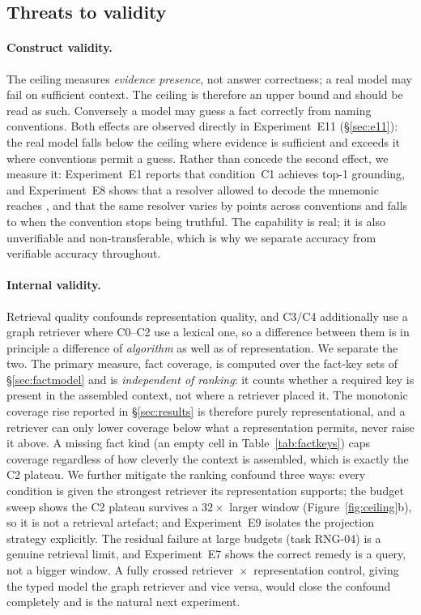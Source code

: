 \subsection{Threats to validity}
\label{sec:threats}

\paragraph{Construct validity.} The ceiling measures \emph{evidence presence},
not answer correctness; a real model may fail on sufficient context. The ceiling
is therefore an upper bound and should be read as such. Conversely a model may
guess a fact correctly from naming conventions. Both effects are observed directly
in Experiment~E11 (\S\ref{sec:e11}): the real model falls below the ceiling where
evidence is sufficient and exceeds it where conventions permit a guess. Rather
than concede the second effect, we measure it: Experiment~E1 reports that
condition~C1 achieves \GrndTopOneCOne{}
top-1 grounding, and Experiment~E8 shows that a resolver allowed to decode the
mnemonic reaches \ConvMnemonicDecoded{}, and that the same resolver varies by
\ConvSpreadCOnePlusconv{} points across conventions and falls to
\ConvLyingDecoded{} when the convention stops being truthful. The capability is
real; it is also unverifiable and non-transferable, which is why we separate
accuracy from verifiable accuracy throughout.

\paragraph{Internal validity.} Retrieval quality confounds representation
quality, and C3/C4 additionally use a graph retriever where C0--C2 use a lexical
one, so a difference between them is in principle a difference of \emph{algorithm}
as well as of representation. We separate the two. The primary measure, fact
coverage, is computed over the fact-key sets of \S\ref{sec:factmodel} and is
\emph{independent of ranking}: it counts whether a required key is present in the
assembled context, not where a retriever placed it. The monotonic coverage rise
reported in \S\ref{sec:results} is therefore purely representational, and a
retriever can only lower coverage below what a representation permits, never
raise it above. A missing fact kind (an empty cell in Table~\ref{tab:factkeys})
caps coverage regardless of how cleverly the context is assembled, which is
exactly the C2 plateau. We further mitigate the ranking confound three ways:
every condition is given the strongest retriever its representation supports; the
budget sweep shows the C2 plateau survives a $32\times$ larger window
(Figure~\ref{fig:ceiling}b), so it is not a retrieval artefact; and
Experiment~E9 isolates the projection strategy explicitly. The residual failure
at large budgets (task RNG-04) is a genuine retrieval limit, and Experiment~E7
shows the correct remedy is a query, not a bigger window. A fully crossed
retriever~$\times$~representation control, giving the typed model the graph
retriever and vice versa, would close the confound completely and is the natural
next experiment.

